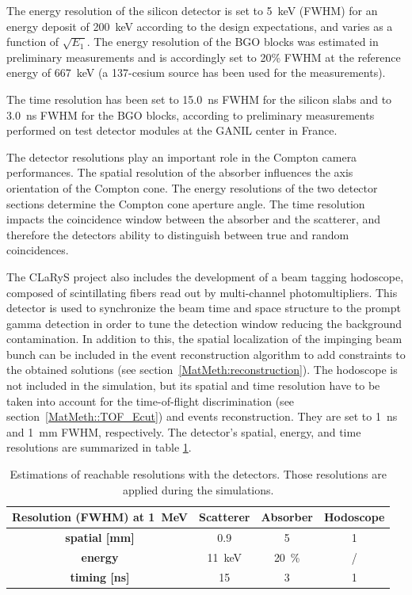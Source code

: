 The energy resolution of the silicon detector is set to 5~keV (FWHM) for an energy deposit of 200~keV according to the design expectations, and varies as a function of $\sqrt{E_{1}}$.
The energy resolution of the BGO blocks was estimated in preliminary measurements and is accordingly set to 20\% FWHM at the reference energy of 667~keV (a 137-cesium source has been used for the measurements). 

The time resolution has been set to 15.0~ns FWHM for the silicon slabs and to 3.0~ns FWHM for the BGO blocks, according to preliminary measurements performed on test detector modules at the GANIL center in France.

The detector resolutions play an important role in the Compton camera performances. The spatial resolution of the absorber influences the axis orientation of the Compton cone. The energy resolutions of the two detector sections determine the Compton cone aperture angle. The time resolution impacts the coincidence window between the absorber and the scatterer, and therefore the detectors ability to distinguish between true and random coincidences.

The CLaRyS project also includes the development of a beam tagging hodoscope, composed of scintillating fibers read out by multi-channel photomultipliers. This detector is used to synchronize the beam time and space structure to the prompt gamma detection in order to tune the detection window reducing the background contamination. In addition to this, the spatial localization of the impinging beam bunch can be included in the event reconstruction algorithm to add constraints to the obtained solutions (see section~\ref{MatMeth:reconstruction}). The hodoscope is not included in the simulation, but its spatial and time resolution have to be taken into account for the time-of-flight discrimination (see section~\ref{MatMeth::TOF_Ecut}) and events reconstruction. They are set to 1~ns and 1~mm FWHM, respectively. The detector's spatial, energy, and time resolutions are summarized in table \ref{table:table_resolution_detecteurs_CC_simulation_Hadronth}.

\begin{table}
\centering
\caption{Estimations of reachable resolutions with the detectors. Those resolutions are applied during the simulations.}
\begin{tabular}{cccc}
\hline
\textbf{Resolution (FWHM) at 1~MeV} & \textbf{Scatterer} & \textbf{Absorber} & \textbf{Hodoscope}\\
\hline 
\textbf{spatial [mm]	}			 &     0.9		 &  5 &	 1\\
\textbf{energy}				&	11~keV		&  20~\%	&	/\\
\textbf{timing [ns]}	        		&	15			&	3 	&  1\\
\hline
\end{tabular}
\label{table:table_resolution_detecteurs_CC_simulation_Hadronth}
\end{table}
    
